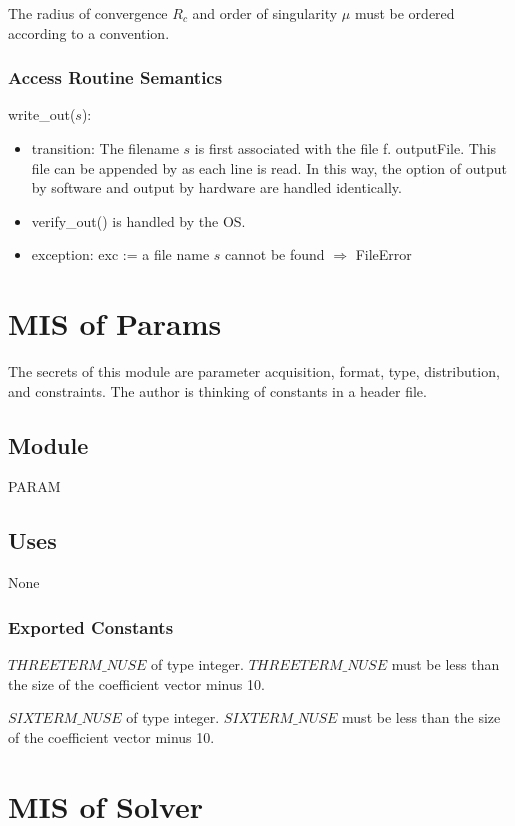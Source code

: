 \documentclass[12pt, titlepage]{article}
\begin{document}
The radius of convergence $R_c$ and order of singularity $\mu$ must be ordered according to a convention.

\subsubsection{Access Routine Semantics}

\noindent write\_out($s$):
\begin{itemize}
\item transition: The filename $s$ is first associated with the file f.  {outputFile}. This file
  can be appended by  as each line is read.
  In this way, the option of output by software and output by hardware are handled identically.
\item verify\_out() is handled by the OS.
\item exception: exc := a file name $s$ cannot be found $\Rightarrow$  FileError
\end{itemize}

\section{MIS of Params} \label{sc:MIS_PARAM}

The secrets of this module are parameter acquisition, format, type, distribution, and constraints.
The author is thinking of constants in a header file.

\subsection{Module}

PARAM

\subsection{Uses}

None

\subsubsection{Exported Constants}

\noindent $THREETERM\_NUSE$ of type integer. $THREETERM\_NUSE$ must be less than the size of the coefficient vector minus 10.

\noindent $SIXTERM\_NUSE$ of type integer. $SIXTERM\_NUSE$ must be less than the size of the coefficient vector minus 10.

\section{MIS of Solver} \label{sc:MIS_SOLVER}
\end{document}
